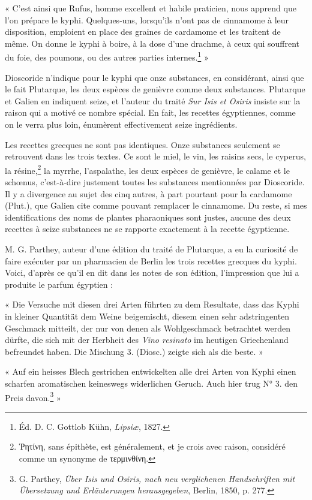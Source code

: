 \documentclass[a4paper, 11pt, oneside]{article}
\begin{document}
« C'est ainsi que Rufus, homme excellent et habile praticien, nous apprend que l'on prépare le kyphi. Quelques-uns, lorsqu'ils n'ont pas de cinnamome à leur disposition, emploient en place des graines de cardamome et les traitent de même. On donne le kyphi à boire, à la dose d'une drachme, à ceux qui souffrent du foie, des poumons, ou des autres parties internes.\footnote{Éd. D. C. Gottlob Kühn, \emph{Lipsiæ}, 1827.} »

Dioscoride n'indique pour le kyphi que onze substances, en considérant, ainsi que le fait Plutarque, les deux espèces de genièvre comme deux substances. Plutarque et Galien en indiquent seize, et l'auteur du traité \emph{Sur Isis et Osiris} insiste sur la raison qui a motivé ce nombre spécial. En fait, les recettes égyptiennes, comme on le verra plus loin, énumèrent effectivement seize ingrédients.

Les recettes grecques ne sont pas identiques. Onze substances seulement se retrouvent dans les trois textes. Ce sont le miel, le vin, les raisins secs, le cyperus, la résine,\footnote{Ῥητίνη, sans épithète, est généralement, et je crois avec raison, considéré comme un synonyme de τερμινθίνη.} la myrrhe, l'aspalathe, les deux espèces de genièvre, le calame et le schœnus, c'est-à-dire justement toutes les substances mentionnées par Dioscoride. Il y a divergence au sujet des cinq autres, à part pourtant pour la cardamome (Plut.), que Galien cite comme pouvant remplacer le cinnamome. Du reste, si mes identifications des noms de plantes pharaoniques sont justes, aucune des deux recettes à seize substances ne se rapporte exactement à la recette égyptienne.

M. G. Parthey, auteur d'une édition du traité de Plutarque, a eu la curiosité de faire exécuter par un pharmacien de Berlin les trois recettes grecques du kyphi. Voici, d'après ce qu'il en dit dans les notes de son édition, l'impression que lui a produite le parfum égyptien :

« Die Versuche mit diesen drei Arten führten zu dem Resultate, dass das Kyphi in kleiner Quantität dem Weine beigemischt, diesem einen sehr adstringenten Geschmack mitteilt, der nur von denen als Wohlgeschmack betrachtet werden dürfte, die sich mit der Herbheit des \emph{Vino resinato} im heutigen Griechenland befreundet haben. Die Mischung 3. (Diosc.) zeigte sich als die beste. »

« Auf ein heisses Blech gestrichen entwickelten alle drei Arten von Kyphi einen scharfen aromatischen keineswegs widerlichen Geruch. Auch hier trug N° 3. den Preis davon.\footnote{G. Parthey, \emph{Über Isis und Osiris, nach neu verglichenen Handschriften mit Übersetzung und Erläuterungen herausgegeben}, Berlin, 1850, p. 277.} »
\end{document}
